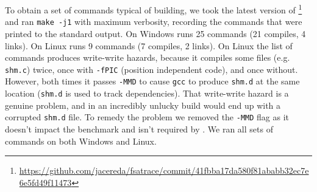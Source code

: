To obtain a set of commands typical of building, we took the latest version of \Fsatrace\footnote{\url{https://github.com/jacereda/fsatrace/commit/41fbba17da580f81ababb32ec7e6e5fd49f11473}} and ran \texttt{make -j1} with maximum verbosity,  recording the commands that were printed to the standard output. On Windows \Fsatrace runs 25 commands (21 compiles, 4 links). On Linux \Fsatrace runs 9 commands (7 compiles, 2 links). On Linux the list of commands produces write-write hazards, because it compiles some files (e.g. \texttt{shm.c}) twice, once with \texttt{-fPIC} (position independent code), and once without. However, both times it passes \texttt{-MMD} to cause \texttt{gcc} to produce \texttt{shm.d} at the same location (\texttt{shm.d} is used to track dependencies). That write-write hazard is a genuine problem, and in an incredibly unlucky build \Fsatrace would end up with a corrupted \texttt{shm.d} file. To remedy the problem we removed the \texttt{-MMD} flag as it doesn't impact the benchmark and isn't required by \Rattle. We ran all sets of commands on both Windows and Linux.


